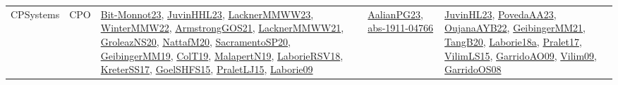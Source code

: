 {\begin{longtable}{lp{3cm}>{\raggedright}p{6cm}>{\raggedright}p{6cm}p{8cm}}
CPSystems & CPO & \href{papers/Bit-Monnot23.pdf}{Bit-Monnot23}\cite{Bit-Monnot23}, \href{papers/JuvinHHL23.pdf}{JuvinHHL23}\cite{JuvinHHL23}, \href{articles/LacknerMMWW23.pdf}{LacknerMMWW23}\cite{LacknerMMWW23}, \href{papers/WinterMMW22.pdf}{WinterMMW22}\cite{WinterMMW22}, \href{papers/ArmstrongGOS21.pdf}{ArmstrongGOS21}\cite{ArmstrongGOS21}, \href{papers/LacknerMMWW21.pdf}{LacknerMMWW21}\cite{LacknerMMWW21}, \href{papers/GroleazNS20.pdf}{GroleazNS20}\cite{GroleazNS20}, \href{papers/NattafM20.pdf}{NattafM20}\cite{NattafM20}, \href{articles/SacramentoSP20.pdf}{SacramentoSP20}\cite{SacramentoSP20}, \href{papers/GeibingerMM19.pdf}{GeibingerMM19}\cite{GeibingerMM19}, \href{papers/ColT19.pdf}{ColT19}\cite{ColT19}, \href{papers/MalapertN19.pdf}{MalapertN19}\cite{MalapertN19}, \href{articles/LaborieRSV18.pdf}{LaborieRSV18}\cite{LaborieRSV18}, \href{articles/KreterSS17.pdf}{KreterSS17}\cite{KreterSS17}, \href{articles/GoelSHFS15.pdf}{GoelSHFS15}\cite{GoelSHFS15}, \href{papers/PraletLJ15.pdf}{PraletLJ15}\cite{PraletLJ15}, \href{papers/Laborie09.pdf}{Laborie09}\cite{Laborie09} & \href{papers/AalianPG23.pdf}{AalianPG23}\cite{AalianPG23}, \href{articles/abs-1911-04766.pdf}{abs-1911-04766}\cite{abs-1911-04766} & \href{papers/JuvinHL23.pdf}{JuvinHL23}\cite{JuvinHL23}, \href{papers/PovedaAA23.pdf}{PovedaAA23}\cite{PovedaAA23}, \href{papers/OujanaAYB22.pdf}{OujanaAYB22}\cite{OujanaAYB22}, \href{papers/GeibingerMM21.pdf}{GeibingerMM21}\cite{GeibingerMM21}, \href{papers/TangB20.pdf}{TangB20}\cite{TangB20}, \href{papers/Laborie18a.pdf}{Laborie18a}\cite{Laborie18a}, \href{papers/Pralet17.pdf}{Pralet17}\cite{Pralet17}, \href{papers/VilimLS15.pdf}{VilimLS15}\cite{VilimLS15}, \href{articles/GarridoAO09.pdf}{GarridoAO09}\cite{GarridoAO09}, \href{papers/Vilim09.pdf}{Vilim09}\cite{Vilim09}, \href{articles/GarridoOS08.pdf}{GarridoOS08}\cite{GarridoOS08}\\

\end{longtable}}
